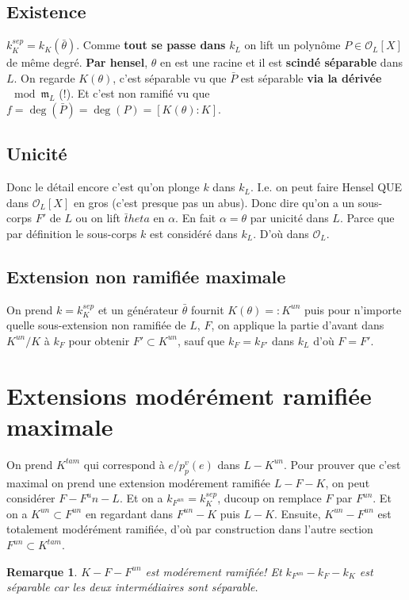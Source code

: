 \documentclass[a4paper,12pt]{book}
\newcommand{\Or}{\mathcal{O}}
\newcommand{\m}{\mathfrak m}
\theoremstyle{plain}
\newtheorem{rem}{Remarque}
\theoremstyle{definition}
\theoremstyle{remark}
\begin{document}
\subsection{Existence}
$k_K^{sep}=k_K(\bar\theta)$. Comme \textbf{tout se passe dans} 
$k_L$ on lift un polynôme $P\in\Or_L[X]$ de même degré. 
\textbf{Par hensel},
$\theta$ en est une racine et il est \textbf{scindé séparable} dans
$L$. On regarde $K(\theta)$, c'est séparable vu que $\bar P$ est
séparable \textbf{via la dérivée} $\mod \m_L$ (!). Et c'est non
ramifié vu que $f=\deg(\bar P)=\deg(P)=[K(\theta):K]$.
\subsection{Unicité}
Donc le détail encore c'est qu'on plonge $k$ dans $k_L$. I.e.
on peut faire Hensel QUE dans $\Or_L[X]$ en gros (c'est presque
pas un abus). Donc dire qu'on a un sous-corps $F'$ de $L$ ou on
lift $\bar theta$ en $\alpha$. En fait $\alpha=\theta$ par unicité
dans $L$. Parce que par définition le sous-corps $k$ est considéré
dans $k_L$. D'où dans $\Or_L$.

\subsection{Extension non ramifiée maximale}
On prend $k=k_K^{sep}$ et un générateur $\bar \theta$ fournit
$K(\theta)=:K^{un}$ puis pour n'importe quelle sous-extension non
ramifiée de $L$, $F$, on applique la partie d'avant dans $K^{un}/K$
à $k_F$ pour obtenir $F'\subset K^{un}$, sauf que $k_F=k_{F'}$
dans $k_L$ d'où $F=F'$.

\section{Extensions modérément ramifiée maximale}
On prend $K^{tam}$ qui correspond à $e/p^v_p(e)$ dans $L-K^{un}$.
Pour prouver que c'est maximal on prend une extension modérement
ramifiée $L-F-K$, on peut considérer $F-F^un-L$. Et on a
$k_{F^{un}}=k_K^{sep}$, ducoup on remplace $F$ par $F^{un}$. Et
on a $K^{un}\subset F^{un}$ en regardant dans $F^{un}-K$ puis
$L-K$. Ensuite, $K^{un}-F^{un}$ est totalement modérément ramifiée,
d'où par construction dans l'autre section $F^{un}\subset K^{tam}$.

\begin{rem}
    $K-F-F^{un}$ est modérement ramifiée! Et $k_{F^{un}}-k_F-k_K$
    est séparable car les deux intermédiaires sont séparable.
\end{rem}
\end{document}

